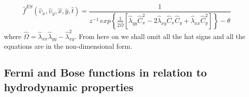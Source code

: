 \documentclass{rsproca}%
\begin{document}
\begin{equation}
\hat{f}^{ES}\left(\hat{\upsilon}_x,\hat{\upsilon}_y,\hat{x},\hat{y},\hat{t}\right) =
\frac{1}{z^{-1}\,exp\left\{ \frac{1}{2 \hat{\Omega}} \left[ \hat{\lambda}_{yy} \hat{C}_x^2 - 2
\hat{\lambda}_{xy} \hat{C}_x \hat{C}_y + \hat{\lambda}_{xx} \hat{C}_y^2 \right]  \right\} - \theta }
\label{eq:normalized_ESBGK_PDF}
\end{equation}
where $\hat{\Omega} = \hat{\lambda}_{xx} \hat{ \lambda}_{yy} - \hat{\lambda}_{xy}^2$.
From here on we shall omit all the hat signs and all the equations are in the non-dimensional form.

\subsection{Fermi and Bose functions in relation to hydrodynamic properties}
\label{subsec:3_2}
\end{document}
